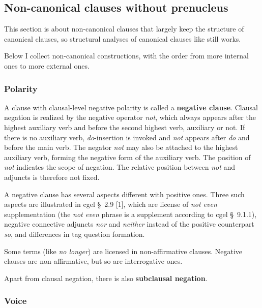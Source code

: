 \documentclass{article}
\newcommand*{\citesec}[1]{\S~{#1}}
\newcommand*{\concept}[1]{\textbf{#1}}
\newcommand*{\corpus}[1]{\emph{#1}}
\begin{document}
\subsection{Non-canonical clauses without prenucleus}\label{sec:in-clause-transformation}

This section is about non-canonical clauses that largely keep the structure of canonical clauses,
so structural analyses of canonical clauses like  still works. %

Below I collect non-canonical constructions, with the order from more internal ones to more external ones.

\subsubsection{Polarity}

A clause with clausal-level negative polarity is called a \concept{negative clause}.
Clausal negation is realized by the negative operator \corpus{not},
which always appears after the highest auxiliary verb and before the second highest verb, auxiliary or not.
If there is no auxiliary verb, 
\corpus{do}-insertion is invoked and \corpus{not} appears after \corpus{do} and before the main verb.
The negator \corpus{not} may also be attached to the highest auxiliary verb,
forming the negative form of the auxiliary verb.
The position of \corpus{not} indicates the scope of negation.
The relative position between \corpus{not} and adjuncts is therefore not fixed.

A negative clause has several aspects different with positive ones.
Three such aspects are illustrated in \ac{cgel} \citesec{2.9} [1], which are
license of \corpus{not even} supplementation 
(the \corpus{not even} phrase is a supplement according to \ac{cgel} \citesec{9.1.1}),
negative connective adjuncts \corpus{nor} and \corpus{neither} instead of the positive counterpart \corpus{so},
and differences in tag question formation.

Some terms (like \corpus{no longer}) are licensed in non-affirmative clauses. 
Negative clauses are non-affirmative, but so are interrogative ones.

Apart from clausal negation, 
there is also \concept{subclausal negation}.

\subsubsection{Voice}\label{sec:voice}
\end{document}

